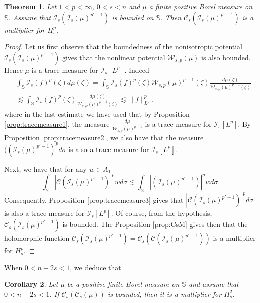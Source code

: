 \documentclass[12pt,twoside,leqno,final]{amsart}
\theoremstyle{plain}
\newtheorem{thm}{Theorem}[section]
\newtheorem{cor}[thm]{Corollary}
\begin{document}
\begin{thm}\label{thm:multex}
Let $1<p<\infty$, $0<s<n$ and $\mu$ a finite positive Borel measure on ${{\mathbb S}}$. Assume that $\mathcal{I}_s(\mathcal{I}_s(\mu)^{p'-1})$ is bounded on ${{\mathbb S}}$. Then ${\mathcal C}_s(\mathcal{I}_s(\mu)^{p'-1})$ is a multiplier for $H_s^p$.
\end{thm}
\begin{proof}
 Let us first observe that the boundedness of the nonisotropic potential $\mathcal{I}_s(\mathcal{I}_s(\mu)^{p'-1})$ gives that the nonlinear potential ${\mathcal W}_{s,p}(\mu)$ is also bounded. Hence $\mu$ is a trace measure for $\mathcal{I}_s[L^p]$.
Indeed
\begin{equation}\label{eqn:multex}\begin{split}&
\int_{{\mathbb S}} \mathcal{I}_s(f)^p(\zeta) d\mu(\zeta)= \int_{{\mathbb S}} \mathcal{I}_s(f)^p(\zeta){\mathcal W}_{s,p}(\mu)^{p-1}(\zeta)\frac{d\mu(\zeta)}{{\mathcal W}_{s,p}(\mu)^{p-1}(\zeta)}\\&\lesssim \int_{{\mathbb S}} \mathcal{I}_s(f)^p(\zeta)\frac{d\mu(\zeta)}{{\mathcal W}_{s,p}(\mu)^{p-1}(\zeta)}\lesssim \|f\|_{L^p}^p,
\end{split}\end{equation}
where in the last estimate we have used that by Proposition \ref{prop:tracemeasure1}, the measure $\displaystyle{\frac{d\mu}{{\mathcal W}_{s,p}(\mu)^{p-1}}}$ is a trace measure for $\mathcal{I}_s[L^p]$. 
By Proposition \ref{prop:tracemeasure2}, we also have that the measure $((\mathcal{I}_s(\mu)^{p'-1})^pd\sigma$ is also a trace measure for $\mathcal{I}_s[L^p]$.

Next, we have that for any $w\in A_1$
$$\int_{{\mathbb S}} |{\mathcal C}(\mathcal{I}_s(\mu)^{p'-1})|^pwd\sigma \lesssim \int_{{\mathbb S}} |(\mathcal{I}_s(\mu)^{p'-1})|^pwd\sigma.$$ Consequently, Proposition \ref{prop:tracemeasure3} gives that
$|{\mathcal C}(\mathcal{I}_s(\mu)^{p'-1})|^pd\sigma$ is also a trace measure for $\mathcal{I}_s[L^p]$. Of course, from the hypothesis, ${\mathcal C}_s(\mathcal{I}_s(\mu)^{p'-1})$ is bounded. The Proposition \ref{prop:CsM} gives then that
the holomorphic function
$\mathcal{C}_s(\mathcal{I}_s(\mu)^{p'-1})= \mathcal{C}_s({\mathcal C}(\mathcal{I}_s(\mu)^{p'-1}))$ is a multiplier for $H_s^p$.

\end{proof}  
When $0<n-2s<1$, we deduce that
\begin{cor}\label{prop:multiplierscas2}
Let $\mu$ be a positive finite Borel measure on ${{\mathbb S}}$ and assume that $0<n-2s<1$. If ${\mathcal C}_s({\mathcal C}_s(\mu))$ is bounded, then it is a multiplier for $H_s^2$.
\end{cor}
\end{document}
